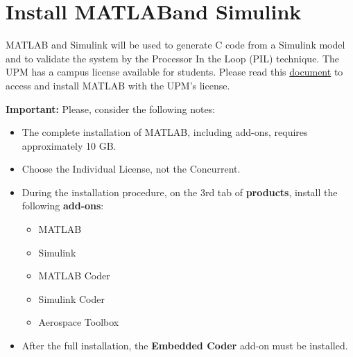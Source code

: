 \section{Install MATLAB\texttrademark and Simulink\texttrademark}

MATLAB and Simulink will be used to generate C code from a Simulink model and 
to validate the system by the Processor In the Loop (PIL) technique. The UPM has a campus license available for students.
Please read this \href{https://www.upm.es/sfs/Rectorado/Vicerrectorado\%20de\%20Tecnologias\%20de\%20la\%20Informacion\%20y\%20Servicios\%20en\%20Red/Servicio\%20de\%20Planificacion\%20Informatica\%20y\%20Comunicaciones/SW/MATLAB\_UPM\_Estudiantes.pdf}{document} to access and install MATLAB with the UPM's license.

\textbf{\textcolor{mRedBrown}{Important:}} Please, consider the following notes:
\begin{itemize}
\item The complete installation of MATLAB, including add-ons, requires approximately 10 GB.

\item Choose the Individual License, not the Concurrent.

\item During the installation procedure, on the 3rd tab of \textbf{products}, install the following \textbf{add-ons}:
\begin{itemize}
	 \item MATLAB
	 \item Simulink
	 \item MATLAB Coder
	 \item Simulink Coder
	 \item Aerospace Toolbox
\end{itemize}

\item After the full installation, the \textbf{Embedded Coder} add-on must be installed.
\end{itemize}
